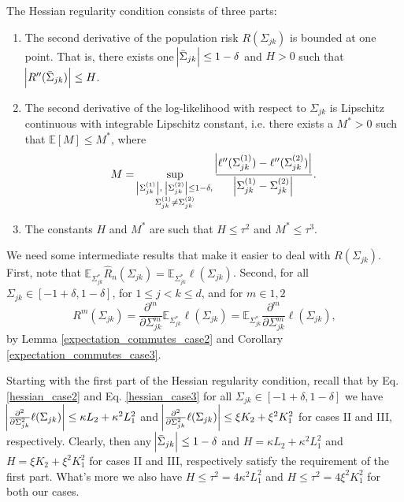 \begin{condition}
    The Hessian regularity condition consists of three parts:
    \begin{enumerate}
        \item The second derivative of the population risk $R(\Sigma_{jk})$ is bounded at one point. That is, there exists one $\abs{\Bar{\Sigma}_{jk}} \leq 1- \delta$ and $H > 0$ such that $\abs{R^{\prime\prime}(\Bar{\Sigma}_{jk})} \leq H$.
        \item The second derivative of the log-likelihood with respect to $\Sigma_{jk}$ is Lipschitz continuous with integrable Lipschitz constant, i.e. there exists a $M^* > 0$ such that $\mathbb{E}[M] \leq M^*$, where 
        \begin{equation*}
            M = \sup_{\substack{\abs{\Sigma_{jk}^{(1)}}, \  \abs{\Sigma_{jk}^{(2)}} \leq 1- \delta, \\ \Sigma_{jk}^{(1)} \neq \Sigma_{jk}^{(2)}}} \frac{\abs{\ell^{\prime\prime}(\Sigma_{jk}^{(1)}) - \ell^{\prime\prime}(\Sigma_{jk}^{(2)})}}{\abs{\Sigma_{jk}^{(1)} - \Sigma_{jk}^{(2)}}}.
        \end{equation*}
        \item The constants $H$ and $M^*$ are such that $H \leq \tau^2$ and $M^*\leq \tau^3$. 
    \end{enumerate}
    We need some intermediate results that make it easier to deal with $R(\Sigma_{jk})$. First, note that $\mathbb{E}_{\Sigma_{jk}^*}\hat{R}_n(\Sigma_{jk}) = \mathbb{E}_{\Sigma_{jk}^*}\ell(\Sigma_{jk})$. Second, for all $\Sigma_{jk} \in [-1+\delta, 1-\delta]$, for $1\leq j < k \leq d$, and for $m \in {1,2}$
    \begin{equation*}
        R^m(\Sigma_{jk}) = \frac{\partial^m}{\partial\Sigma_{jk}^m}\mathbb{E}_{\Sigma_{jk}^*}\ell(\Sigma_{jk}) = \mathbb{E}_{\Sigma_{jk}^*}\frac{\partial^m}{\partial\Sigma_{jk}^m}\ell(\Sigma_{jk}),
    \end{equation*}
    by Lemma \ref{expectation_commutes_case2} and Corollary \ref{expectation_commutes_case3}.  
    
    Starting with the first part of the Hessian regularity condition, recall that by Eq. \eqref{hessian_case2} and Eq. \eqref{hessian_case3} for all $\Sigma_{jk} \in [-1+\delta, 1-\delta]$ we have $\abs{\frac{\partial^2}{\partial\Sigma_{jk}^2}\ell(\Sigma_{jk})} \leq \kappa L_2 + \kappa^2L_1^2$ and $\abs{\frac{\partial^2}{\partial\Sigma_{jk}^2}\ell(\Sigma_{jk})} \leq \xi K_2 + \xi^2K_1^2$ for cases II and III, respectively. Clearly, then any $\abs{\Bar{\Sigma}_{jk}} \leq 1-\delta$ and $H = \kappa L_2 + \kappa^2L_1^2$ and $H = \xi K_2 + \xi^2K_1^2$ for cases II and III, respectively satisfy the requirement of the first part. What's more we also have $H \leq \tau^2 = 4\kappa^2L_1^2$ and $H \leq \tau^2 = 4\xi^2K_1^2$ for both our cases. 
    

\end{condition}
